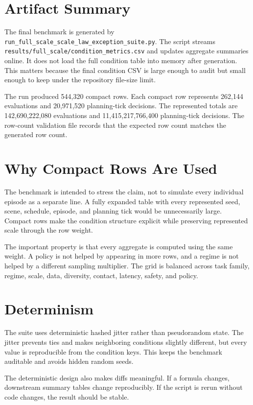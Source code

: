 \section{Artifact Summary}

The final benchmark is generated by \texttt{run\_full\_scale\_scale\_law\_exception\_suite.py}. The script streams \texttt{results/full\_scale/condition\_metrics.csv} and updates aggregate summaries online. It does not load the full condition table into memory after generation. This matters because the final condition CSV is large enough to audit but small enough to keep under the repository file-size limit.

The run produced 544,320 compact rows. Each compact row represents 262,144 evaluations and 20,971,520 planning-tick decisions. The represented totals are 142,690,222,080 evaluations and 11,415,217,766,400 planning-tick decisions. The row-count validation file records that the expected row count matches the generated row count.

\section{Why Compact Rows Are Used}

The benchmark is intended to stress the claim, not to simulate every individual episode as a separate line. A fully expanded table with every represented seed, scene, schedule, episode, and planning tick would be unnecessarily large. Compact rows make the condition structure explicit while preserving represented scale through the row weight.

The important property is that every aggregate is computed using the same weight. A policy is not helped by appearing in more rows, and a regime is not helped by a different sampling multiplier. The grid is balanced across task family, regime, scale, data, diversity, contact, latency, safety, and policy.

\section{Determinism}

The suite uses deterministic hashed jitter rather than pseudorandom state. The jitter prevents ties and makes neighboring conditions slightly different, but every value is reproducible from the condition keys. This keeps the benchmark auditable and avoids hidden random seeds.

The deterministic design also makes diffs meaningful. If a formula changes, downstream summary tables change reproducibly. If the script is rerun without code changes, the result should be stable.

